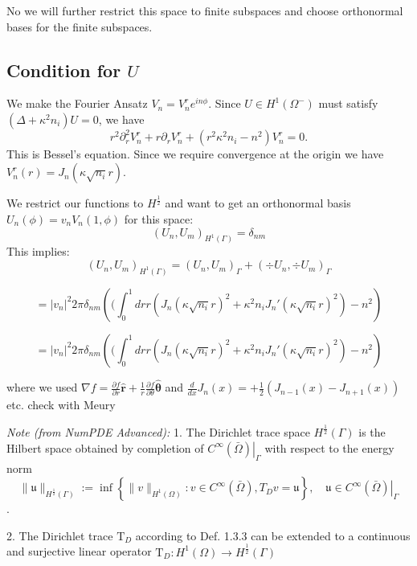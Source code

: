 \documentclass[10pt,journal,compsoc]{IEEEtran}
\begin{document}
No we will further restrict this space to finite subspaces and choose orthonormal bases for the finite subspaces. 
\subsection{Condition for $U$ }
We make the Fourier Ansatz $V_n = V^r_n e^{i n \phi}$. 
Since $U \in H^1(\Omega^-)$ must satisfy  $(\Delta + \kappa^2 n_i) U = 0$, we have 
$$
r^2 \partial_r^2V_n^r + r \partial_r V_n^r + (r^2 \kappa^2 n_i - n^2)V^r_n = 0.
$$
This is Bessel's equation. Since we require convergence at the origin we have $V^r_n(r) = J_n(\kappa \sqrt{n_i} r)$.


We restrict our functions to $H^{\frac{1}{2}}$ and want to get an orthonormal basis $U_n(\phi) = v_n V_n(1, \phi)$ for this space: 
$$
(U_n, U_m)_{H^1(\Gamma)} = \delta_{nm}
$$
This implies: 
$$
(U_n, U_m)_{H^1(\Gamma)} = (U_n, U_m)_{\Gamma} + (\div U_n, \div U_m)_{\Gamma}
$$

$$
 = |v_n|^2 2\pi \delta_{nm} \left( (\int_0^1 dr r (J_n(\kappa \sqrt{n_i} r)^2 + \kappa^2 n_i J_n'(\kappa \sqrt{n_i} r)^2 ) - n^2 
 \right)
$$

$$
= |v_n|^2 2\pi \delta_{nm} \left( (\int_0^1 dr r (J_n(\kappa \sqrt{n_i} r)^2 + \kappa^2 n_i  J_n'(\kappa \sqrt{n_i} r)^2 ) - n^2 
\right)
$$

where we used \(\nabla f = \frac{\partial f}{\partial r} \hat{\mathbf{r}}+\frac{1}{r} \frac{\partial f}{\partial \theta} \hat{\boldsymbol{\theta}}\)  and \(\frac{d}{d x} J_{n}(x)=+\frac{1}{2}\left(J_{n-1}(x)-J_{n+1}(x)\right)\) 
etc. check with Meury

\textit{Note (from NumPDE Advanced):} 1. The Dirichlet trace space \(H^{\frac{1}{2}}(\Gamma)\) is the Hilbert space obtained by completion of \(\left.C^{\infty}(\bar{\Omega})\right|_{\Gamma}\) with
respect to the energy norm
$$
\|\mathfrak{u}\|_{H^{\frac{1}{2}}(\Gamma)}:=\inf \left\{\|v\|_{H^{1}(\Omega)}: v \in C^{\infty}(\bar{\Omega}), T_{D} v=\mathfrak{u}\right\},\left.\quad \mathfrak{u} \in C^{\infty}(\bar{\Omega})\right|_{\Gamma}
$$. 

2. The Dirichlet trace \(\mathrm{T}_{D}\) according to Def. 1.3.3 can be extended to a continuous and surjective linear
operator \(\mathrm{T}_{D}: H^{1}(\Omega) \rightarrow H^{\frac{1}{2}}(\Gamma)\)
\end{document}
